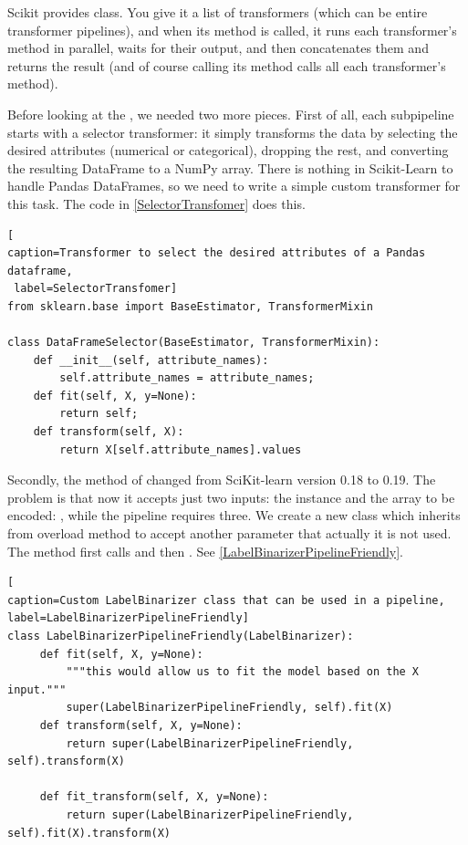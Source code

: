 Scikit provides  class. You give it a list of transformers (which can be entire transformer pipelines), and when its  method is called, it runs each transformer’s  method in parallel, waits for their output, and then concatenates them and returns the result (and of course calling its  method calls all each transformer’s  method). 

Before looking at the , we needed two more pieces. First of all, each subpipeline starts with a selector transformer: it simply transforms the data by selecting the desired attributes (numerical or categorical), dropping the rest, and converting the resulting DataFrame to a NumPy array. There is nothing in Scikit-Learn to handle Pandas DataFrames, so we need to write a simple custom transformer for this task. The code in \autoref{SelectorTransfomer} does this.

\begin{lstlisting}[
caption=Transformer to select the desired attributes of a Pandas dataframe,
 label=SelectorTransfomer]
from sklearn.base import BaseEstimator, TransformerMixin

class DataFrameSelector(BaseEstimator, TransformerMixin):
    def __init__(self, attribute_names):
        self.attribute_names = attribute_names;
    def fit(self, X, y=None):
        return self;
    def transform(self, X):
        return X[self.attribute_names].values
\end{lstlisting}

Secondly, the method  of  changed from SciKit-learn version 0.18 to 0.19. The problem is that now it accepts just two inputs: the instance and the array to be encoded: , while the pipeline requires three.
We create a new class  which inherits from  overload  method to accept another parameter  that actually it is not used. The method first calls  and then . See \autoref{LabelBinarizerPipelineFriendly}.
\begin{lstlisting}[
caption=Custom LabelBinarizer class that can be used in a pipeline, 
label=LabelBinarizerPipelineFriendly]
class LabelBinarizerPipelineFriendly(LabelBinarizer):
     def fit(self, X, y=None):
         """this would allow us to fit the model based on the X input."""
         super(LabelBinarizerPipelineFriendly, self).fit(X)
     def transform(self, X, y=None):
         return super(LabelBinarizerPipelineFriendly, self).transform(X)

     def fit_transform(self, X, y=None):
         return super(LabelBinarizerPipelineFriendly, self).fit(X).transform(X)
\end{lstlisting}

